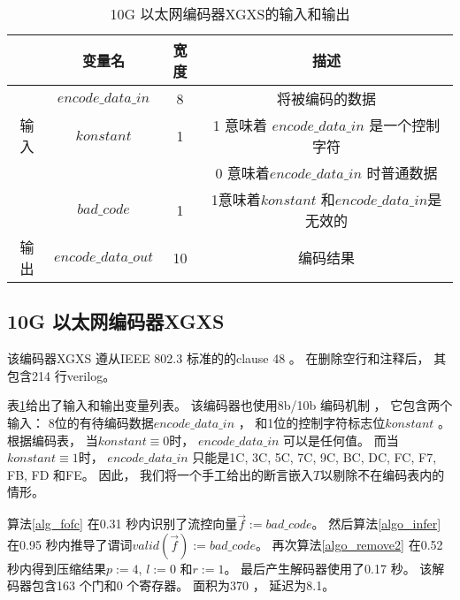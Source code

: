 \begin{table}[t]%
\caption{10G 以太网编码器XGXS的输入和输出}
\label{tab:eth10g}
\begin{tabular}{|c|c|c|c|}
\hline
         & 变量名               & 宽度  & 描述\\\hline\hline
         & $encode\_data\_in$   & 8     &将被编码的数据 \\\cline{2-4}
输入     & $konstant$           & 1     &1 意味着 $encode\_data\_in$ 是一个控制字符\\
         &                      &       &0 意味着$encode\_data\_in$ 时普通数据\\\cline{2-4}
         & $bad\_code$          & 1     &1意味着$konstant$ 和$encode\_data\_in$是无效的\\\hline
输出     & $encode\_data\_out$  & 10    &编码结果\\\hline
\end{tabular}
\end{table}%

\subsection{10G 以太网编码器XGXS}\label{subsec_10g}
该编码器XGXS 遵从IEEE 802.3 标准的的clause 48 。
在删除空行和注释后，
其包含214 行verilog。

表\ref{tab:eth10g}给出了输入和输出变量列表。
该编码器也使用8b/10b 编码机制 ，
它包含两个输入：
8位的有待编码数据$encode\_data\_in$ ，
和1位的控制字符标志位$konstant$ 。
根据编码表，
当$konstant\equiv 0$时，
$encode\_data\_in$ 可以是任何值。
而当$konstant\equiv 1$时，
$encode\_data\_in$ 只能是1C, 3C, 5C, 7C, 9C, BC, DC, FC, F7, FB, FD 和FE。
因此，
我们将一个手工给出的断言嵌入$T$以剔除不在编码表内的情形。

算法\ref{alg_fofc} 在0.31 秒内识别了流控向量$\vec{f}:=bad\_code$。
然后算法\ref{algo_infer}
在0.95 秒内推导了谓词$valid(\vec{f}):=\!bad\_code$。
再次算法\ref{algo_remove2} 在0.52 秒内得到压缩结果$p:=4$, $l:=0$ 和$r:=1$。
最后产生解码器使用了0.17 秒。
该解码器包含163 个门和0 个寄存器。
面积为370 ，
延迟为8.1。

